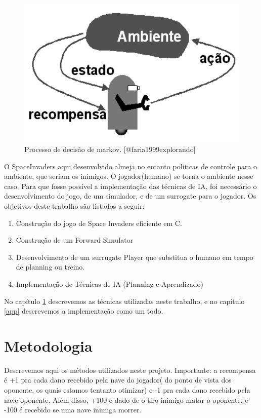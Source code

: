 \documentclass[]{book}
\providecommand{\tightlist}{%
  \setlength{\itemsep}{0pt}\setlength{\parskip}{0pt}}
\begin{document}
\begin{figure}

{\centering \includegraphics[width=0.5\linewidth]{content/imgs/agente-ambiente} 

}

\caption{Processo de decisão de markov. [@faria1999explorando]}\label{fig:pdm}
\end{figure}

O SpaceInvaders aqui desenvolvido almeja no entanto politicas de
controle para o ambiente, que seriam os inimigos. O jogador(humano) se
torna o ambiente nesse caso. Para que fosse possível a implementação das
técnicas de IA, foi necessário o desenvolvimento do jogo, de um
simulador, e de um surrogate para o jogador. Os objetivos deste trabalho
são listados a seguir:

\begin{enumerate}
\def\labelenumi{\arabic{enumi}.}
\tightlist
\item
  Construção do jogo de Space Invaders eficiente em C.
\item
  Construção de um Forward Simulator
\item
  Desenvolvimento de um surrugate Player que substitua o humano em tempo
  de planning ou treino.
\item
  Implementação de Técnicas de IA (Planning e Aprendizado)
\end{enumerate}

No capítulo \ref{methods} descrevemos as técnicas utilizadas neste
trabalho, e no capítulo \ref{app} descrevemos a implementação como um
todo.

\chapter{Metodologia}\label{methods}

Descrevemos aqui os métodos utilizados neste projeto. Importante: a
recompensa é +1 pra cada dano recebido pela nave do jogador( do ponto de
vista dos oponente, os quais estamos tentanto otimizar) e -1 pra cada
dano recebido pela nave oponente. Além disso, +100 é dado de o tiro
inimigo matar o oponente, e -100 é recebido se uma nave inimiga morrer.
\end{document}
